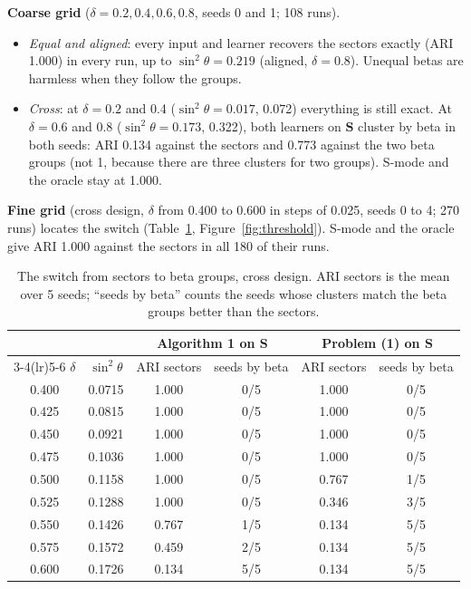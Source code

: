 \documentclass[11pt,a4paper]{article}
\newcommand{\Smat}{\mathbf{S}}
\theoremstyle{remark}
\begin{document}
\textbf{Coarse grid} ($\delta=0.2,0.4,0.6,0.8$, seeds 0 and 1; 108 runs).
\begin{itemize}
\item \emph{Equal and aligned}: every input and learner recovers the sectors exactly
  (ARI 1.000) in every run, up to $\sin^2\theta=0.219$ (aligned, $\delta=0.8$). Unequal
  betas are harmless when they follow the groups.
\item \emph{Cross}: at $\delta=0.2$ and 0.4 ($\sin^2\theta=0.017$, 0.072) everything
  is still exact. At $\delta=0.6$ and 0.8 ($\sin^2\theta=0.173$, 0.322), both learners
  on $\Smat$ cluster by beta in both seeds: ARI 0.134 against the sectors and 0.773
  against the two beta groups (not 1, because there are three clusters for two
  groups). S-mode and the oracle stay at 1.000.
\end{itemize}

\textbf{Fine grid} (cross design, $\delta$ from 0.400 to 0.600 in steps of 0.025, seeds 0
to 4; 270 runs) locates the switch (Table~\ref{tab:threshold},
Figure~\ref{fig:threshold}). S-mode and the oracle give ARI 1.000 against the sectors
in all 180 of their runs.

\begin{table}[h]
\centering\small
\begin{tabular}{cccccc}
\toprule
 & & \multicolumn{2}{c}{Algorithm 1 on $\Smat$} & \multicolumn{2}{c}{Problem (1) on $\Smat$} \\
\cmidrule(lr){3-4}\cmidrule(lr){5-6}
$\delta$ & $\sin^2\theta$ & ARI sectors & seeds by beta & ARI sectors & seeds by beta \\
\midrule
0.400 & 0.0715 & 1.000 & 0/5 & 1.000 & 0/5 \\
0.425 & 0.0815 & 1.000 & 0/5 & 1.000 & 0/5 \\
0.450 & 0.0921 & 1.000 & 0/5 & 1.000 & 0/5 \\
0.475 & 0.1036 & 1.000 & 0/5 & 1.000 & 0/5 \\
0.500 & 0.1158 & 1.000 & 0/5 & 0.767 & 1/5 \\
0.525 & 0.1288 & 1.000 & 0/5 & 0.346 & 3/5 \\
0.550 & 0.1426 & 0.767 & 1/5 & 0.134 & 5/5 \\
0.575 & 0.1572 & 0.459 & 2/5 & 0.134 & 5/5 \\
0.600 & 0.1726 & 0.134 & 5/5 & 0.134 & 5/5 \\
\bottomrule
\end{tabular}
\caption{The switch from sectors to beta groups, cross design. ARI sectors is the mean
over 5 seeds; ``seeds by beta'' counts the seeds whose clusters match the beta groups
better than the sectors.}
\label{tab:threshold}
\end{table}
\end{document}
